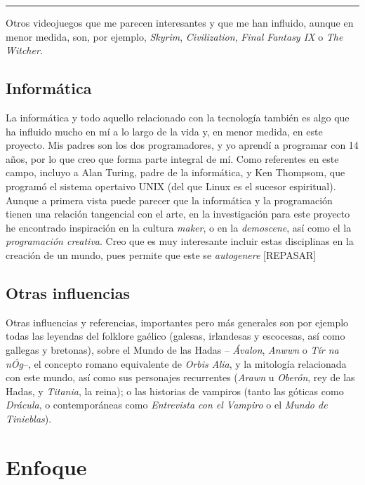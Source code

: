 \begin{center}\rule{0.5\linewidth}{0.5pt}\end{center}

Otros videojuegos que me parecen interesantes y que me han influido,
aunque en menor medida, son, por ejemplo, \emph{Skyrim},
\emph{Civilization}, \emph{Final Fantasy IX} o \emph{The Witcher}.

\hypertarget{informuxe1tica}{%
\subsection{Informática}\label{informuxe1tica}}

La informática y todo aquello relacionado con la tecnología también es
algo que ha influido mucho en mí a lo largo de la vida y, en menor
medida, en este proyecto. Mis padres son los dos programadores, y yo
aprendí a programar con 14 años, por lo que creo que forma parte
integral de mí. Como referentes en este campo, incluyo a Alan Turing,
padre de la informática, y Ken Thompsom, que programó el sistema
opertaivo UNIX (del que Linux es el sucesor espiritual). Aunque a
primera vista puede parecer que la informática y la programación tienen
una relación tangencial con el arte, en la investigación para este
proyecto he encontrado inspiración en la cultura \emph{maker}, o en la
\emph{demoscene}, así como el la \emph{programación creativa}. Creo que
es muy interesante incluir estas disciplinas en la creación de un mundo,
pues permite que este se \emph{autogenere} {[}REPASAR{]}

\hypertarget{otras-influencias}{%
\subsection{Otras influencias}\label{otras-influencias}}

Otras influencias y referencias, importantes pero más generales son por
ejemplo todas las leyendas del folklore gaélico (galesas, irlandesas y
escocesas, así como gallegas y bretonas), sobre el Mundo de las Hadas --
\emph{Ávalon}, \emph{Anwwn} o \emph{Tír na nÓg}--, el concepto romano
equivalente de \emph{Orbis Alia}, y la mitología relacionada con este
mundo, así como sus personajes recurrentes (\emph{Arawn} u
\emph{Oberón}, rey de las Hadas, y \emph{Titania}, la reina); o las
historias de vampiros (tanto las góticas como \emph{Drácula}, o
contemporáneas como \emph{Entrevista con el Vampiro} o el \emph{Mundo de
Tinieblas}).

\hypertarget{enfoque}{%
\section{Enfoque}\label{enfoque}}

